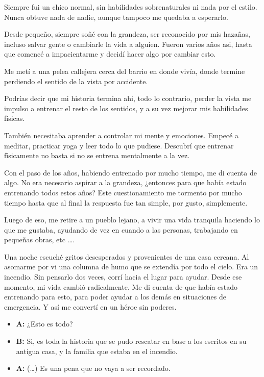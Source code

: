\documentclass[letterpaper, 12pt]{report}
\begin{document}
Siempre fui un chico normal, sin habilidades sobrenaturales
ni nada por el estilo. Nunca obtuve nada de nadie, aunque
tampoco me quedaba a esperarlo.

Desde pequeño, siempre soñé con la grandeza, ser reconocido
por mis hazañas, incluso salvar gente o cambiarle la vida a
alguien. Fueron varios años asi, hasta que comencé a
impacientarme y decidí hacer algo por cambiar esto.

Me metí a una pelea callejera cerca del barrio en donde
vivía, donde termine perdiendo el sentido de la vista por
accidente.

Podrías decir que mi historia termina ahi, todo lo
contrario, perder la vista me impulso a entrenar el resto
de los sentidos, y a su vez mejorar mis habilidades
físicas.

También necesitaba aprender a controlar mi mente y
emociones. Empecé a meditar, practicar yoga y leer todo lo
que pudiese. Descubrí que entrenar físicamente no basta si
no se entrena mentalmente a la vez.

Con el paso de los años, habiendo entrenado por mucho
tiempo, me di cuenta de algo. No era necesario aspirar a la
grandeza, ¿entonces para que había estado entrenando todos
estos años? Este cuestionamiento me tormento por mucho
tiempo hasta que al final la respuesta fue tan simple, por
gusto, simplemente.

Luego de eso, me retire a un pueblo lejano, a vivir una
vida tranquila haciendo lo que me gustaba, ayudando de vez
en cuando a las personas, trabajando en pequeñas obras, etc
\dots.

Una noche escuché gritos desesperados y provenientes de una
casa cercana. Al asomarme por vi una columna de humo que se
extendía por todo el cielo. Era un incendio. Sin pensarlo
dos veces, corrí hacia el lugar para ayudar. Desde ese
momento, mi vida cambió radicalmente. Me di cuenta de que
había estado entrenando para esto, para poder ayudar a los
demás en situaciones de emergencia. Y así me convertí en un
héroe sin poderes.

\begin{itemize}
      \item \textbf{A:} ¿Esto es todo?
      \item \textbf{B:} Si, es toda la historia que se pudo rescatar en base a los
            escritos en su antigua casa, y la familia que estaba en el
            incendio.
      \item \textbf{A:} (\dots) Es una pena que no vaya a ser recordado.
\end{itemize}
\end{document}
